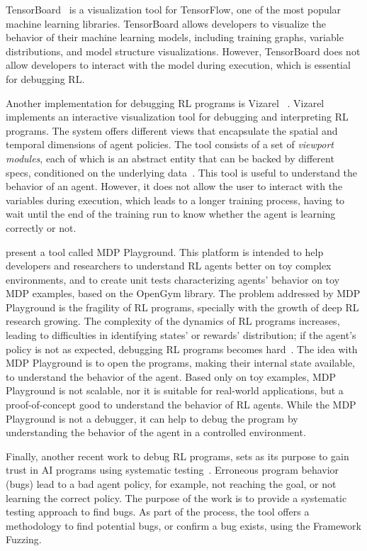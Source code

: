 TensorBoard~\cite{tensorboard} is a 
visualization tool for TensorFlow, one of the most popular machine learning libraries. 
TensorBoard allows developers to visualize the behavior of their machine learning models, 
including training graphs, variable distributions, and model structure visualizations. However, 
TensorBoard does not allow developers to interact with the model during execution, which is 
essential for debugging \ac{RL}.

Another implementation for debugging \ac{RL} programs is \ac{Vizarel} ~\cite{deshpande20}.
\ac{Vizarel} implements an interactive visualization tool for debugging and interpreting \ac{RL} 
programs. The system offers different views that encapsulate the spatial and temporal dimensions 
of agent policies. The tool consists of a set of \emph{viewport modules}, each of which is an 
abstract entity that can be backed by different specs, conditioned on the underlying 
data~\cite{deshpande20}. This tool is useful to understand the behavior of an agent. However, it 
does not allow the user to interact with the variables during execution, which leads to a longer training 
process, having to wait until the end of the training run to know whether the agent is learning correctly 
or not.

\citet{rajan23} present a tool called \ac{MDP} Playground. This platform is intended to help 
developers and researchers to understand \ac{RL} agents better on toy complex environments, and 
to create unit tests characterizing agents' behavior  on toy \ac{MDP} examples, based on the 
OpenGym library. The problem addressed by \ac{MDP} Playground is the fragility of \ac{RL} 
programs, specially with the growth of deep \ac{RL} research growing. The complexity of the 
dynamics of \ac{RL} programs increases, leading to difficulties in identifying states' or rewards' 
distribution; if the agent's policy is not as expected, debugging \ac{RL} programs becomes 
hard~\cite{rajan23}. The idea with \ac{MDP} Playground is to open the programs, making their 
internal state available, to understand the behavior of the agent. Based only on toy examples, 
\ac{MDP} Playground is not scalable, nor it is suitable for real-world applications, but a 
proof-of-concept good to understand the behavior of \ac{RL} agents. While the \ac{MDP} Playground 
is not a debugger, it can help to debug the program by understanding the behavior of the agent in a 
controlled environment.

Finally, another recent work to debug \ac{RL} programs, sets as its purpose to gain trust in \ac{AI} 
programs using systematic testing~\cite{steinmetz21}. Erroneous program behavior (\ie bugs) lead to 
a bad agent policy, for example, not reaching the goal, or not learning the correct policy. The purpose 
of the work is to provide a systematic testing approach to find bugs. As part of the process, the tool 
offers a methodology to find potential bugs, or confirm a bug exists, using the Framework Fuzzing.

